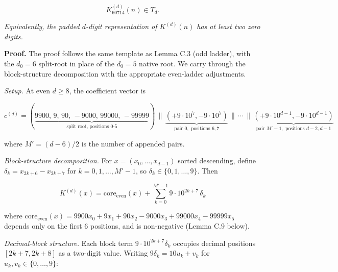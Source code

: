 \documentclass[11pt,letterpaper]{article}
\theoremstyle{paperstyle}
\theoremstyle{paperstyledef}
\theoremstyle{paperstylerem}
\begin{document}
\[K^{(d)}_{60714}(n) \in T_d.\]

\emph{Equivalently, the padded \(d\)-digit representation of
\(K^{(d)}(n)\) has at least two zero digits.}

\textbf{Proof.} The proof follows the same template as Lemma C.3 (odd
ladder), with the \(d_0 = 6\) split-root in place of the \(d_0 = 5\)
native root. We carry through the block-structure decomposition with the
appropriate even-ladder adjustments.

\emph{Setup.} At even \(d \geq 8\), the coefficient vector is

\[c^{(d)} = (\underbrace{9900,\, 9,\, 90,\, -9000,\, 99000,\, -99999}_{\text{split root, positions } 0\text{-}5}) \, \| \, \underbrace{(+9 \cdot 10^7, -9 \cdot 10^7)}_{\text{pair }0,\text{ positions }6,7} \, \| \, \cdots \, \| \, \underbrace{(+9 \cdot 10^{d-1}, -9 \cdot 10^{d-1})}_{\text{pair }M'-1,\text{ positions }d-2,d-1}\]

where \(M' = (d - 6)/2\) is the number of appended pairs.

\emph{Block-structure decomposition.} For \(x = (x_0, \ldots, x_{d-1})\)
sorted descending, define \(\delta_k = x_{2k+6} - x_{2k+7}\) for
\(k = 0, 1, \ldots, M'-1\), so \(\delta_k \in \{0, 1, \ldots, 9\}\).
Then

\[K^{(d)}(x) = \mathrm{core}_{\mathrm{even}}(x) + \sum_{k=0}^{M'-1} 9 \cdot 10^{2k+7} \, \delta_k\]

where
\(\mathrm{core}_{\mathrm{even}}(x) = 9900 x_0 + 9 x_1 + 90 x_2 - 9000 x_3 + 99000 x_4 - 99999 x_5\)
depends only on the first \(6\) positions, and is non-negative (Lemma
C.9 below).

\emph{Decimal-block structure.} Each block term
\(9 \cdot 10^{2k+7} \delta_k\) occupies decimal positions
\([2k+7, 2k+8]\) as a two-digit value. Writing
\(9 \delta_k = 10 u_k + v_k\) for \(u_k, v_k \in \{0, \ldots, 9\}\):
\end{document}
